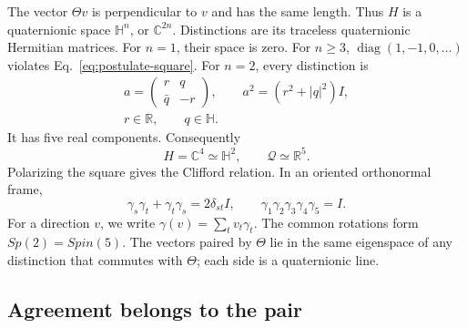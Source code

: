 \documentclass[aps,prx,reprint,longbibliography]{revtex4-2}
\providecommand{\diag}{\operatorname{diag}}
\providecommand{\R}{\mathbb R}
\providecommand{\C}{\mathbb C}
\providecommand{\HH}{\mathbb H}
\begin{document}
The vector $\Theta v$ is perpendicular to $v$ and has the same length. Thus $H$ is a quaternionic space $\HH^n$, or $\C^{2n}$. Distinctions are its traceless quaternionic Hermitian matrices. For $n=1$, their space is zero. For $n\geq3$, $\diag(1,-1,0,\ldots)$ violates Eq.~\eqref{eq:postulate-square}. For $n=2$, every distinction is
\begin{equation}
 \begin{gathered}
 a=\begin{pmatrix}r&q\\\bar q&-r\end{pmatrix},\qquad
 a^2=(r^2+|q|^2)I,\\
 r\in\R,\qquad q\in\HH.
 \end{gathered}
 \label{eq:quaternionic}
\end{equation}
It has five real components. Consequently
\begin{equation}
 H=\C^4\simeq\HH^2,\qquad \mathscr Q\simeq\R^5.
 \label{eq:four-five}
\end{equation}
Polarizing the square gives the Clifford relation. In an oriented orthonormal frame,
\begin{equation}
 \gamma_s\gamma_t+\gamma_t\gamma_s=2\delta_{st}I,
 \qquad \gamma_1\gamma_2\gamma_3\gamma_4\gamma_5=I.
 \label{eq:clifford}
\end{equation}
For a direction $v$, we write $\gamma(v)=\sum_t v_t\gamma_t$.
The common rotations form $Sp(2)=Spin(5)$. The vectors paired by $\Theta$ lie in the same eigenspace of any distinction that commutes with $\Theta$; each side is a quaternionic line.

\subsection{Agreement belongs to the pair}
\end{document}
